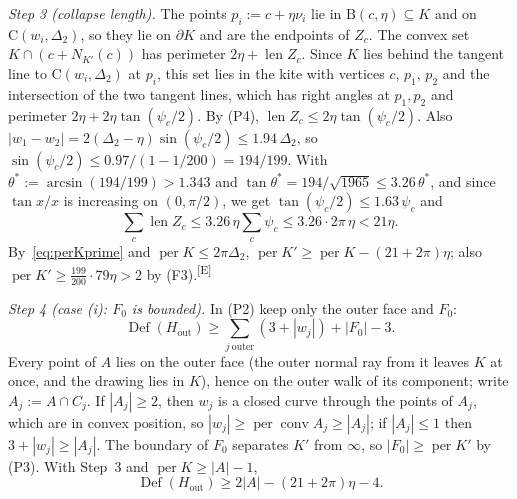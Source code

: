 \documentclass[11pt]{amsart}
\theoremstyle{definition}
\theoremstyle{remark}
\newcommand{\Dt}{\Delta_2}
\newcommand{\conv}{\operatorname{conv}}
\newcommand{\Cc}{\mathrm{C}}      %
\newcommand{\Dd}{\mathrm{B}}      %
\newcommand{\chk}[1]{\textsuperscript{[#1]}}
\begin{document}
\emph{Step 3 (collapse length).} The points $p_i:=c+\eta\nu_i$ lie in $\Dd(c,\eta)\subseteq K$ and on $\Cc(w_i,\Dt)$, so they lie on $\partial K$ and are the endpoints of $Z_c$. The convex set $K\cap(c+N_{K'}(c))$ has perimeter $2\eta+\operatorname{len}Z_c$. Since $K$ lies behind the tangent line to $\Cc(w_i,\Dt)$ at $p_i$, this set lies in the kite with vertices $c$, $p_1$, $p_2$ and the intersection of the two tangent lines, which has right angles at $p_1,p_2$ and perimeter $2\eta+2\eta\tan(\psi_c/2)$. By (P4), $\operatorname{len}Z_c\le2\eta\tan(\psi_c/2)$. Also $|w_1-w_2|=2(\Dt-\eta)\sin(\psi_c/2)\le1.94\,\Dt$, so $\sin(\psi_c/2)\le0.97/(1-1/200)=194/199$. With $\theta^*:=\arcsin(194/199)>1.343$ and $\tan\theta^*=194/\sqrt{1965}\le3.26\,\theta^*$, and since $\tan x/x$ is increasing on $(0,\pi/2)$, we get $\tan(\psi_c/2)\le1.63\,\psi_c$ and
\begin{equation}\label{eq:collapse}
\sum_c\operatorname{len}Z_c\le3.26\,\eta\sum_c\psi_c\le3.26\cdot2\pi\,\eta<21\eta .
\end{equation}
By~\eqref{eq:perKprime} and $\operatorname{per}K\le2\pi\Dt$, $\operatorname{per}K'\ge\operatorname{per}K-(21+2\pi)\eta$; also $\operatorname{per}K'\ge\frac{199}{200}\cdot79\eta>2$ by (F3).\chk{E}

\emph{Step 4 (case (i): $F_0$ is bounded).} In (P2) keep only the outer face and $F_0$:
\[
\operatorname{Def}(H_{\mathrm{out}})\ge\sum_{j\ \mathrm{outer}}(3+|w_j|)+|F_0|-3 .
\]
Every point of $A$ lies on the outer face (the outer normal ray from it leaves $K$ at once, and the drawing lies in $K$), hence on the outer walk of its component; write $A_j:=A\cap C_j$. If $|A_j|\ge2$, then $w_j$ is a closed curve through the points of $A_j$, which are in convex position, so $|w_j|\ge\operatorname{per}\conv A_j\ge|A_j|$; if $|A_j|\le1$ then $3+|w_j|\ge|A_j|$. The boundary of $F_0$ separates $K'$ from $\infty$, so $|F_0|\ge\operatorname{per}K'$ by (P3). With Step~3 and $\operatorname{per}K\ge|A|-1$,
\[
\operatorname{Def}(H_{\mathrm{out}})\ge2|A|-(21+2\pi)\eta-4 .
\]
\end{document}
